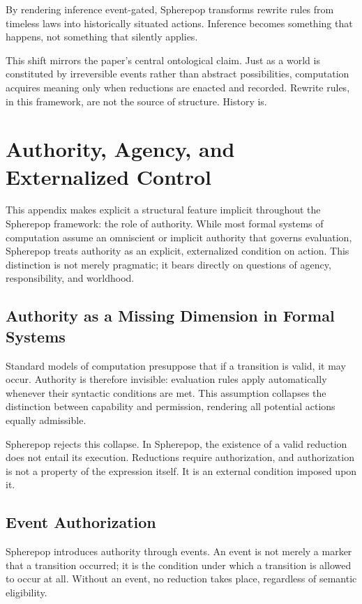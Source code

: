 \documentclass[11pt]{article}
\begin{document}
By rendering inference event-gated, Spherepop transforms rewrite rules from timeless laws into historically situated actions. Inference becomes something that happens, not something that silently applies.

This shift mirrors the paper’s central ontological claim. Just as a world is constituted by irreversible events rather than abstract possibilities, computation acquires meaning only when reductions are enacted and recorded. Rewrite rules, in this framework, are not the source of structure. History is.

\section{Authority, Agency, and Externalized Control}

This appendix makes explicit a structural feature implicit throughout the Spherepop framework: the role of authority. While most formal systems of computation assume an omniscient or implicit authority that governs evaluation, Spherepop treats authority as an explicit, externalized condition on action. This distinction is not merely pragmatic; it bears directly on questions of agency, responsibility, and worldhood.

\subsection{Authority as a Missing Dimension in Formal Systems}

Standard models of computation presuppose that if a transition is valid, it may occur. Authority is therefore invisible: evaluation rules apply automatically whenever their syntactic conditions are met. This assumption collapses the distinction between capability and permission, rendering all potential actions equally admissible.

Spherepop rejects this collapse. In Spherepop, the existence of a valid reduction does not entail its execution. Reductions require authorization, and authorization is not a property of the expression itself. It is an external condition imposed upon it.

\subsection{Event Authorization}

Spherepop introduces authority through events. An event is not merely a marker that a transition occurred; it is the condition under which a transition is allowed to occur at all. Without an event, no reduction takes place, regardless of semantic eligibility.
\end{document}
